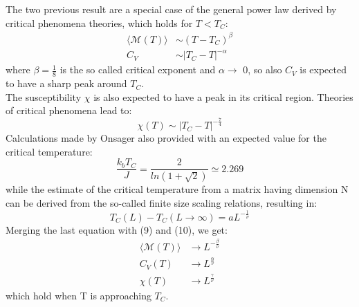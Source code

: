 \documentclass[10pt,a4paper,titlepage]{article}
\begin{document}
The two previous result are a special case of the general power law derived by critical phenomena theories, which holds for $T < T_{C}$: 
\begin{equation}\begin{split}
\langle \mathscr{M}(T)\rangle &\sim (T-T_{C})^{\beta}\\
C_{V} &\sim | T_{C} - T |^{-\alpha}
\end{split}\end{equation}
where $\beta = \frac{1}{8}$ is the so called critical exponent and $\alpha \rightarrow$ 0, so also $C_{V}$ is expected to have a sharp peak around $T_{C}$.\\
The susceptibility $\chi$ is also expected to have a peak in its critical region. Theories of critical phenomena lead to:
\begin{equation}
\chi(T) \sim |T_{C}-T|^{-\frac{7}{4}}
\end{equation}
Calculations made by Onsager also provided with an expected value for the critical temperature:
\begin{equation}
\frac{k_{b}T_{C}}{J}=\frac{2}{ln(1+\sqrt{2})} \simeq 2.269
\end{equation}
while the estimate of the critical temperature from a matrix having dimension N can be derived from the so-called finite size scaling relations, resulting in:
\begin{equation}
T_{C}(L)-T_{C}(L \rightarrow \infty) = aL^{-\frac{1}{\nu}}
\end{equation}
Merging the last equation with (9) and (10), we get:
\begin{equation}\begin{split}
\langle \mathscr{M}(T)\rangle &\rightarrow L^{-\frac{\beta}{\nu}}\\
C_{V}(T) &\rightarrow L^{\frac{\alpha}{\nu}}\\
\chi (T) &\rightarrow L^{\frac{\gamma}{\nu}}
\end{split}\end{equation}
which hold when T is approaching $T_{C}$.
\end{document}
